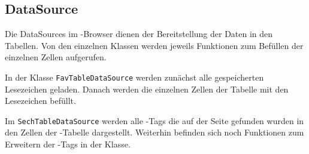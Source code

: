 
\subsection{DataSource}
Die DataSources im \SECH-Browser dienen der Bereitstellung der Daten in den Tabellen. Von den einzelnen Klassen werden jeweils Funktionen zum Befüllen der einzelnen Zellen aufgerufen.

In der Klasse \lstinline|FavTableDataSource| werden zunächst alle gespeicherten Lesezeichen geladen. Danach werden die einzelnen Zellen der Tabelle mit den Lesezeichen befüllt.

Im \lstinline|SechTableDataSource| werden alle \SEARCH-Tags die auf der Seite gefunden wurden in den Zellen der \SECH-Tabelle dargestellt. Weiterhin befinden sich noch Funktionen zum Erweitern der \SEARCH-Tags in der Klasse.
